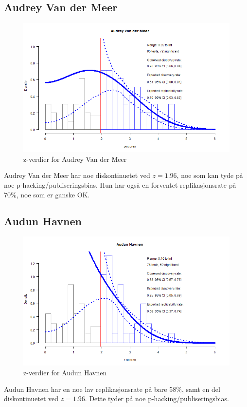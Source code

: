 \documentclass[doc,norsk]{apa7}
\begin{document}
\subsection{Audrey Van der Meer}
\begin{figure}[h!]
    \centering
    \includegraphics[width=\textwidth]{images/Audrey Van der Meer.png}
    \caption{z-verdier for Audrey Van der Meer}
\end{figure}
Audrey Van der Meer har noe diskontinuetet ved $z=1.96$, noe som kan tyde på noe p-hacking/publiseringsbias. Hun har også en forventet replikasjonsrate på 70\%, noe som er ganske OK.


\subsection{Audun Havnen}
\begin{figure}[h!]
    \centering
    \includegraphics[width=\textwidth]{images/Audun Havnen.png}
    \caption{z-verdier for Audun Havnen}
\end{figure}
Audun Havnen har en noe lav replikasjonsrate på bare 58\%, samt en del diskontinuetet ved $z=1.96$. Dette tyder på noe p-hacking/publiseringsbias.
\end{document}
